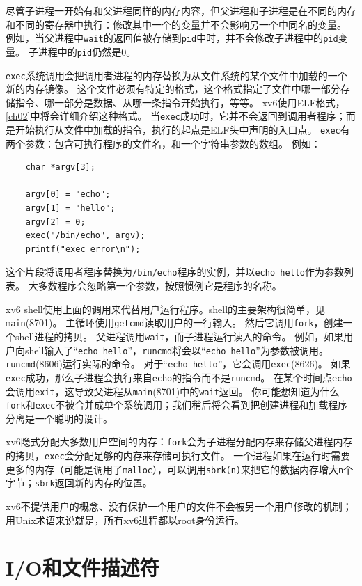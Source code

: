 尽管子进程一开始有和父进程同样的内存内容，但父进程和子进程是在不同的内存和不同的寄存器中执行：修改其中一个的变量并不会影响另一个中同名的变量。
例如，当父进程中\texttt{wait}的返回值被存储到\texttt{pid}中时，并不会修改子进程中的\texttt{pid}变量。
子进程中的\texttt{pid}仍然是0。

\texttt{exec}系统调用会把调用者进程的内存替换为从文件系统的某个文件中加载的一个新的内存镜像。
这个文件必须有特定的格式，这个格式指定了文件中哪一部分存储指令、哪一部分是数据、从哪一条指令开始执行，等等。
xv6使用ELF格式，\autoref{ch02}中将会详细介绍这种格式。
当\texttt{exec}成功时，它并不会返回到调用者程序；而是开始执行从文件中加载的指令，执行的起点是ELF头中声明的入口点。
\texttt{exec}有两个参数：包含可执行程序的文件名，和一个字符串参数的数组。
例如：
\begin{lstlisting}
    char *argv[3];

    argv[0] = "echo";
    argv[1] = "hello";
    argv[2] = 0;
    exec("/bin/echo", argv);
    printf("exec error\n");
\end{lstlisting}

这个片段将调用者程序替换为\texttt{/bin/echo}程序的实例，并以\texttt{echo hello}作为参数列表。
大多数程序会忽略第一个参数，按照惯例它是程序的名称。

xv6 shell使用上面的调用来代替用户运行程序。shell的主要架构很简单，见\texttt{main}(8701)。
主循环使用\texttt{getcmd}读取用户的一行输入。
然后它调用\texttt{fork}，创建一个shell进程的拷贝。
父进程调用\texttt{wait}，而子进程运行读入的命令。
例如，如果用户向shell输入了“\texttt{echo hello}”，\texttt{runcmd}将会以“\texttt{echo hello}”为参数被调用。
\texttt{runcmd}(8606)运行实际的命令。
对于“\texttt{echo hello}”，它会调用\texttt{exec}(8626)。
如果\texttt{exec}成功，那么子进程会执行来自\texttt{echo}的指令而不是\texttt{runcmd}。
在某个时间点\texttt{echo}会调用\texttt{exit}，这导致父进程从\texttt{main}(8701)中的\texttt{wait}返回。
你可能想知道为什么\texttt{fork}和\texttt{exec}不被合并成单个系统调用；我们稍后将会看到把创建进程和加载程序分离是一个聪明的设计。

xv6隐式分配大多数用户空间的内存：\texttt{fork}会为子进程分配内存来存储父进程内存的拷贝，\texttt{exec}会分配足够的内存来存储可执行文件。
一个进程如果在运行时需要更多的内存（可能是调用了\texttt{malloc}），可以调用\texttt{sbrk(n)}来把它的数据内存增大\texttt{n}个字节；\texttt{sbrk}返回新的内存的位置。

xv6不提供用户的概念、没有保护一个用户的文件不会被另一个用户修改的机制；用Unix术语来说就是，所有xv6进程都以root身份运行。

\section*{I/O和文件描述符}

